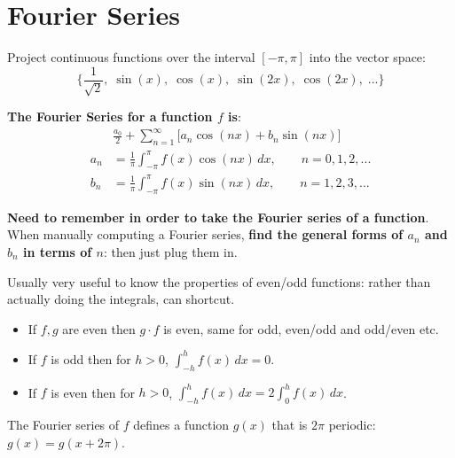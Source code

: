 \documentclass[a4paper, 11pt]{article}
\begin{document}
\section*{Fourier Series}
{
    Project continuous functions over the interval \([-\pi,\pi]\) into the vector space:
    \[\Bigg\{ \frac{1}{\sqrt{2}},\;\sin(x),\;\cos(x),\;\sin(2x),\;\cos(2x),\;... \Bigg\}\]

    \textbf{The Fourier Series for a function \(f\) is}:
    \begin{align*}
    & \frac{a_0}{2} + \sum_{n=1}^\infty\Big[ a_n\cos(nx) + b_n\sin(nx) \Big] \\
    a_n &= \frac{1}{\pi} \int_{-\pi}^\pi{f(x)\cos(nx)\,dx}, \qquad n=0,1,2,... \\
    b_n &= \frac{1}{\pi} \int_{-\pi}^\pi{f(x)\sin(nx)\,dx}, \qquad n=1,2,3,...
    \end{align*}

    \textbf{Need to remember in order to take the Fourier series of a function}. When manually computing a Fourier series, \textbf{find the general forms of \(a_n\) and \(b_n\) in terms of \(n\)}: then just plug them in.

    Usually very useful to know the properties of even/odd functions: rather than actually doing the integrals, can shortcut.
    \begin{itemize}
    \item If \(f,g\) are even then \(g \cdot f\) is even, same for odd, even/odd and odd/even etc.
    \item If \(f\) is odd then for \(h>0\), \(\displaystyle \int_{-h}^h{f(x)\,dx} = 0\).
    \item If \(f\) is even then for \(h>0\), \(\displaystyle \int_{-h}^h{f(x)\,dx} = 2\int_0^h{f(x)\,dx}\).
    \end{itemize}

    The Fourier series of \(f\) defines a function \(g(x)\) that is \(2\pi\) periodic: \(g(x) = g(x+2\pi)\).
}
\end{document}
